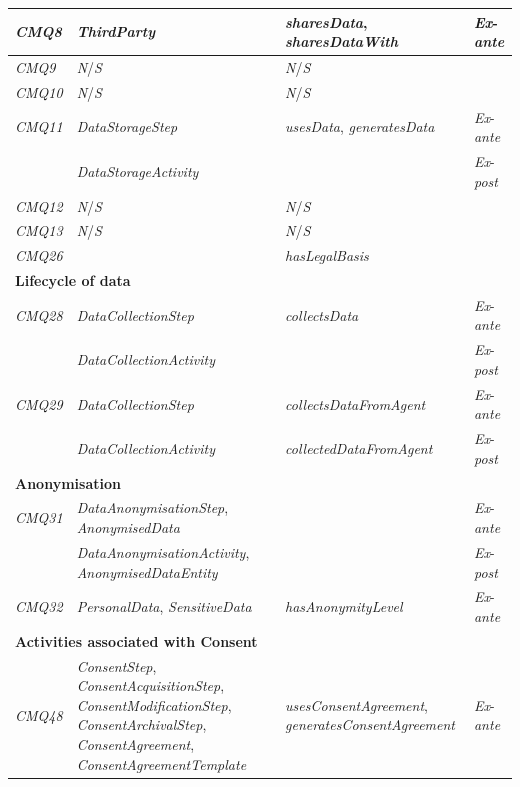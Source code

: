 \begin{table}[htbp]
\begin{tabularx}{\linewidth}{|l|X|p{5cm}|l|}
\textit{CMQ8} & \textit{ThirdParty} & \textit{sharesData}, \textit{sharesDataWith} & \textit{Ex}-\textit{ante} \\ \hline
\textit{CMQ9} & \textit{N}/\textit{S} & \textit{N}/\textit{S} &  \\ \hline
\textit{CMQ10} & \textit{N}/\textit{S} & \textit{N}/\textit{S} &  \\ \hline
\textit{CMQ11} & \textit{DataStorageStep} & \textit{usesData}, \textit{generatesData} & \textit{Ex}-\textit{ante} \\ \hline
 & \textit{DataStorageActivity} &  & \textit{Ex}-\textit{post} \\ \hline
\textit{CMQ12} & \textit{N}/\textit{S} & \textit{N}/\textit{S} &  \\ \hline
\textit{CMQ13} & \textit{N}/\textit{S} & \textit{N}/\textit{S} &  \\ \hline
\textit{CMQ26} &  & \textit{hasLegalBasis} &  \\ \hline
\multicolumn{4}{|l|}{\textbf{Lifecycle of data}} \\ \hline
\textit{CMQ28} & \textit{DataCollectionStep} & \textit{collectsData} & \textit{Ex}-\textit{ante} \\ \hline
 & \textit{DataCollectionActivity} &  & \textit{Ex}-\textit{post} \\ \hline
\textit{CMQ29} & \textit{DataCollectionStep} & \textit{collectsDataFromAgent} & \textit{Ex}-\textit{ante} \\ \hline
 & \textit{DataCollectionActivity} & \textit{collectedDataFromAgent} & \textit{Ex}-\textit{post} \\ \hline
\multicolumn{4}{|l|}{\textbf{Anonymisation}} \\ \hline
\textit{CMQ31} & \textit{DataAnonymisationStep}, \textit{AnonymisedData} &  & \textit{Ex}-\textit{ante} \\ \hline
 & \textit{DataAnonymisationActivity}, \textit{AnonymisedDataEntity} &  & \textit{Ex}-\textit{post} \\ \hline
\textit{CMQ32} & \textit{PersonalData}, \textit{SensitiveData} & \textit{hasAnonymityLevel} & \textit{Ex}-\textit{ante} \\ \hline
\multicolumn{4}{|l|}{\textbf{Activities associated with Consent}} \\ \hline
\textit{CMQ48} & \textit{ConsentStep}, \textit{ConsentAcquisitionStep}, \textit{ConsentModificationStep}, \textit{ConsentArchivalStep}, \textit{ConsentAgreement}, \textit{ConsentAgreementTemplate} & \textit{usesConsentAgreement}, \textit{generatesConsentAgreement} & \textit{Ex}-\textit{ante} \\ \hline

\end{tabularx}
\end{table}
